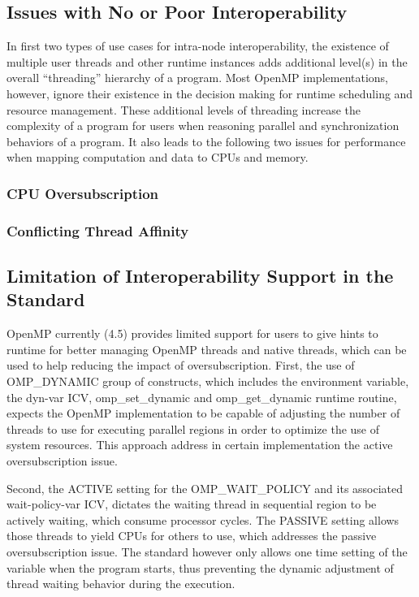\subsection{Issues with No or Poor Interoperability}
In first two types of use cases for intra-node interoperability, 
the existence of multiple user threads and other runtime instances
adds additional level(s) in the overall ``threading''
hierarchy of a program. %
Most OpenMP implementations, however, ignore their existence %
in the decision making for runtime scheduling and resource management. 
These additional levels of threading increase the complexity of a program for 
users when reasoning parallel and synchronization behaviors of a program. It also leads to the following two issues  
for performance when mapping computation and data to CPUs and memory.  

\subsubsection{CPU Oversubscription}


\subsubsection{Conflicting Thread Affinity}


\subsection{Limitation of Interoperability Support in the Standard}
OpenMP currently (4.5) provides limited support for users to give hints to runtime for 
better managing OpenMP threads and native threads, which can be used to help reducing 
the impact of oversubscription.
First, the use of {\sf OMP\_DYNAMIC} group of constructs, which includes the environment variable, 
the {\sf dyn-var} ICV, {\sf omp\_set\_dynamic} and {\sf omp\_get\_dynamic} runtime routine,
expects the OpenMP implementation to be capable of adjusting the number of threads to use for executing parallel
regions in order to optimize the use of system resources. This approach address in certain implementation the active
oversubscription issue. 

Second, the {\sf ACTIVE} setting for the {\sf OMP\_WAIT\_POLICY} and its associated {\sf wait-policy-var} ICV, 
dictates the waiting thread in sequential region to be actively waiting, which consume processor cycles.
The {\sf PASSIVE} setting allows those threads to yield CPUs for others to use, which addresses the passive 
oversubscription issue. The standard however only allows one time setting of the variable when the program starts, thus 
preventing the dynamic adjustment of thread waiting behavior during the execution. 

